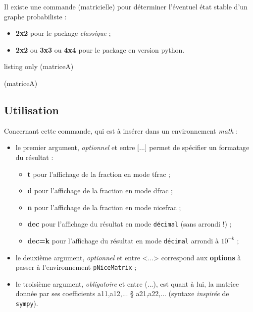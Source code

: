 \documentclass[french,a4paper,11pt]{article}
\newcommand\Cle[1]{{\bfseries\sffamily\textlangle #1\textrangle}}
\newcommand\cmaj[1]{\tcbox[vignetteMaJ]{#1}\xspace}
\begin{document}
\begin{cautionblock}
\cmaj{0.1.4} Il existe une commande (matricielle) pour déterminer l'éventuel état stable d'un graphe probabiliste :

\begin{itemize}
	\item \textbf{2x2} pour le package \textit{classique} ;
	\item \textbf{2x2} ou \textbf{3x3} ou \textbf{4x4} pour le package en version \textsf{python}.
\end{itemize}
\vspace*{-\baselineskip}\leavevmode
\end{cautionblock}

\begin{PresentationCode}{listing only}
(matriceA)

(matriceA)
\end{PresentationCode}

\subsection{Utilisation}

\begin{tipblock}
Concernant cette commande, qui est à insérer dans un environnement \textit{math} :

\begin{itemize}
	\item le premier argument, \textit{optionnel} et entre \textsf{[...]} permet de spécifier un formatage du résultat :
	\begin{itemize}
		\item \Cle{t} pour l'affichage de la fraction en mode \textsf{tfrac} ;
		\item \Cle{d} pour l'affichage de la fraction en mode \textsf{dfrac} ;
		\item \Cle{n} pour l'affichage de la fraction en mode \textsf{nicefrac} ;
		\item \Cle{dec} pour l'affichage du résultat en mode \texttt{décimal} (sans arrondi !) ;
		\item \Cle{dec=k} pour l'affichage du résultat en mode \texttt{décimal} arrondi à $10^{-k}$ ;
	\end{itemize}
	\item le deuxième argument, \textit{optionnel} et entre \textsf{<...>} correspond aux \Cle{options} à passer à l'environnement \texttt{pNiceMatrix} ;
	\item le troisième argument, \textit{obligatoire} et entre \textsf{(...)}, est quant à lui, la matrice donnée par ses coefficients \textsf{a11,a12,... § a21,a22,...} (syntaxe \textit{inspirée} de \texttt{sympy}).
\end{itemize}
\vspace*{-\baselineskip}\leavevmode
\end{tipblock}
\end{document}

